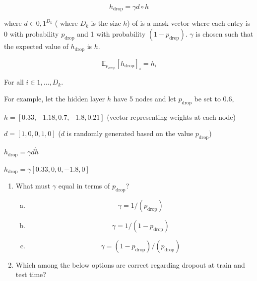\begin{enumerate}[1.]
\begin{equation*}
    h_{\text{drop}} = \gamma d \circ h
\end{equation*}

where $d \in {0, 1}^{D_k}$  ( where $D_k$ is the size $h$) of is a mask vector where each entry is 0 with probability $p_\text{drop}$ and 1 with probability $(1 - p_\text{drop})$. $\gamma$ is chosen such that the expected value of $h_\text{drop}$ is $h$.

\begin{equation*}
   \mathbb{E}_{p_{\text{drop}}}[h_\text{drop}]_i = h_{\text{i}}
\end{equation*}

For all $i \in {1,...,D_k}$.

For example, let the hidden layer $h$ have 5 nodes and let $p_\text{drop}$ be set to 0.6,

$h = [0.33, -1.18, 0.7, -1.8, 0.21]$ (vector representing weights at each node)

$d = [1, 0, 0, 1, 0]$  ($d$ is randomly generated based on the value $p_\text{drop}$)

$h_\text{drop} = \gamma d\dot h$

$h_\text{drop} = \gamma [0.33, 0, 0, -1.8, 0]$

\begin{enumerate}[3a.]

\item {} What must $\gamma$ equal in terms of $p_\text{drop}$?

\begin{enumerate}[(a)]
\item \begin{equation*}\gamma = 1 / (p_{\text{drop}})\end{equation*}
\item \begin{equation*}\gamma = 1 / (1 - p_{\text{drop}})\end{equation*}
\item \begin{equation*}\gamma = (1 - p_{\text{drop}}) / (p_{\text{drop}})\end{equation*}
\end{enumerate}


\item {} Which among the below options are correct regarding dropout at train and test time?


\end{enumerate}
\end{enumerate}
